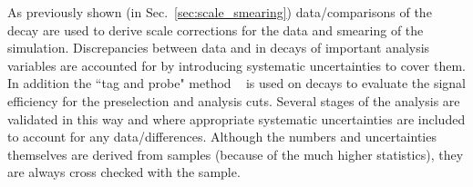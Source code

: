 As previously shown (in Sec.~\ref{sec:scale_smearing}) data/\MC comparisons of the \Zee decay are used to derive scale corrections for the data and smearing of the \MC simulation. Discrepancies between data and \MC in \Zee decays of important analysis variables are accounted for by introducing systematic uncertainties to cover them. In addition the ``tag and probe" method ~\cite{tag_and_probe} is used on \Zee decays to evaluate the signal efficiency for the preselection and analysis cuts. Several stages of the analysis are validated in this way and where appropriate systematic uncertainties are included to account for any data/\MC differences. Although the numbers and uncertainties themselves are derived from \Zee samples (because of the much higher statistics), they are always cross checked with the \Zmumugamma sample.
